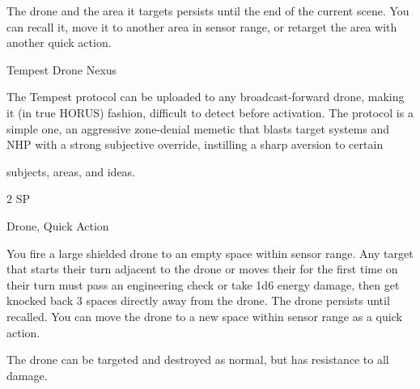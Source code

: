 The drone and the area it targets persists until the end of the current scene. You can recall it,  
move it to another area in sensor range, or retarget the area with another quick action.
 

Tempest Drone Nexus  

The Tempest protocol can be uploaded to any broadcast-forward drone, making it (in true HORUS) fashion,  
difficult to detect before activation. The protocol is a simple one, an aggressive zone-denial memetic that  
blasts target systems and NHP with a strong subjective override, instilling a sharp aversion to certain  

subjects, areas, and ideas.     

2 SP
 

Drone, Quick Action
 

You fire a large shielded drone to an empty space within sensor range. Any target that starts their  
turn adjacent to the drone or moves their for the first time on their turn must pass an engineering  
check or take 1d6 energy damage, then get knocked back 3 spaces directly away from the  
drone. The drone persists until recalled. You can move the drone to a new space within sensor  
range as a quick action. 
 

The drone can be targeted and destroyed as normal, but has resistance to all damage.
 